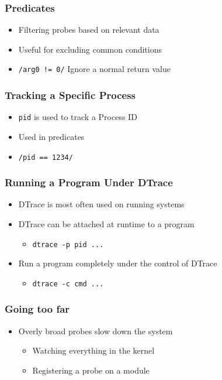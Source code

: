 \documentclass[pdftex]{beamer} %
\begin{document}
\begin{frame}[fragile]
  \frametitle{Predicates}
  \begin{itemize}
  \item Filtering probes based on relevant data
  \item Useful for excluding common conditions
  \item \verb+/arg0 != 0/+  Ignore a normal return value
  \end{itemize}
\end{frame}

\begin{frame}[fragile]
  \frametitle{Tracking a Specific Process}
  \begin{itemize}
  \item \verb+pid+ is used to track a Process ID
  \item Used in predicates
  \item \verb+/pid == 1234/+
\end{itemize}
\end{frame}

\begin{frame}[fragile]
  \frametitle{Running a Program Under DTrace}
  \begin{itemize}
  \item DTrace is most often used on running systems
  \item DTrace can be attached at runtime to a program
    \begin{itemize}
    \item \verb+dtrace -p pid ...+
    \end{itemize}
  \item Run a program completely under the control of DTrace
    \begin{itemize}
    \item \verb+dtrace -c cmd ...+
    \end{itemize}
  \end{itemize}
\end{frame}

\begin{frame}
  \frametitle{Going too far}
  \begin{itemize}
  \item Overly broad probes slow down the system
    \begin{itemize}
    \item Watching everything in the kernel
    \item Registering a probe on a module
    \end{itemize}
  \end{itemize}
\end{frame}
\end{document}
